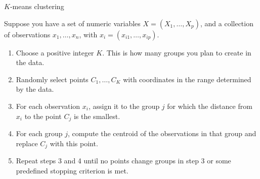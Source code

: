 \documentclass[
  ignorenonframetext,
]{beamer}
\providecommand{\tightlist}{%
  \setlength{\itemsep}{0pt}\setlength{\parskip}{0pt}}
\begin{document}
\begin{frame}{\(K\)-means clustering}
\protect\hypertarget{k-means-clustering}{}

Suppose you have a set of numeric variables \(X=(X_1, \ldots, X_p)\),
and a collection of observations \(x_1, \ldots, x_n\), with
\(x_i=(x_{i1},\ldots,x_{ip})\).

\begin{enumerate}
\tightlist
\item
  Choose a positive integer \(K\). This is how many groups you plan to
  create in the data.
\item
  Randomly select points \(C_1, \ldots, C_K\) with coordinates in the
  range determined by the data.
\item
  For each observation \(x_i\), assign it to the group \(j\) for which
  the distance from \(x_i\) to the point \(C_j\) is the smallest.
\item
  For each group \(j\), compute the centroid of the observations in that
  group and replace \(C_j\) with this point.
\item
  Repeat steps 3 and 4 until no points change groups in step 3 or some
  predefined stopping criterion is met.
\end{enumerate}

\end{frame}
\end{document}
